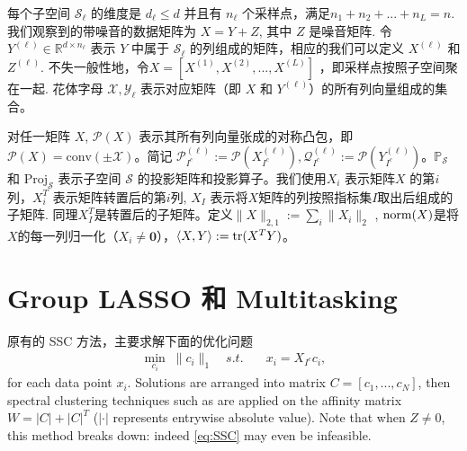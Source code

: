 \documentclass[main]{subfiles}
\begin{document}
每个子空间 $\mathcal{S}_{\ell}$ 的维度是 $d_{\ell} \le d$ 并且有 $n_{\ell}$
个采样点，满足$n_1 +n_2+...+n_L=n$. 我们观察到的带噪音的数据矩阵为 $X = Y+Z$,
其中 $Z$ 是噪音矩阵. 令 $Y^{(\ell)}\in \mathbb{R}^{d\times n_{\ell}}$ 表示 
$Y$ 中属于 $\mathcal{S}_{\ell}$ 的列组成的矩阵，相应的我们可以定义 $X^{(\ell)}$ 和 $Z^{(\ell)}$.
不失一般性地，令$X=[X^{(1)},X^{(2)},...,X^{(L)}]$ ，即采样点按照子空间聚在一起.
花体字母 $\mathcal{X},\mathcal{Y_{\ell}}$ 表示对应矩阵（即 $X$ 和 $Y^{(\ell)}$）的所有列向量组成的集合。

对任一矩阵 $X$, $\mathcal{P}(X)$ 表示其所有列向量张成的对称凸包，即
$\mathcal{P}(X) = \mathrm{conv}(\pm \mathcal{X})$。简记
$\mathcal{P}_{I^c}^{(\ell)} := \mathcal{P}(X_{I^c}^{(\ell)}), \mathcal{Q}_{I^c}^{(\ell)} :=
\mathcal{P}(Y_{I^c}^{(\ell)})$。$\mathbb{P}_{\mathcal{S}}$ 和
$\mathrm{Proj}_{\mathcal{S}}$ 表示子空间 $\mathcal{S}$
的投影矩阵和投影算子。我们使用$X_i$ 表示矩阵$X$ 的第$i$列，$X_i^T$ 表示矩阵转置后的第$i$列, $X_I$
表示将$X$矩阵的列按照指标集$I$取出后组成的子矩阵.
同理$X^T_I$是转置后的子矩阵。定义$\|X\|_{2, 1}:= \sum_i \|X_i\|_2$ ,
$\mathrm{norm}(X)$是将$X$的每一列归一化（$X_i \neq \mathbf{0}$），$\langle X, Y \rangle
:= \mathrm{tr}(X^T Y)$。

\section{Group LASSO 和 Multitasking}
原有的 SSC 方法，主要求解下面的优化问题
\begin{equation}\label{eq:SSC}
  \begin{aligned}
    \min_{c_i} \; \|c_i\|_1 \quad s.t. \quad &x_i=X_{I^c}c_i,
  \end{aligned}
\end{equation}
for each data point $x_i$. Solutions are arranged into matrix $C=[c_1,...,c_N]$, then spectral clustering techniques such as \cite{ng2002spectral} are applied on the affinity matrix $W=|C|+|C|^T$ ($|\cdot|$ represents entrywise absolute value). Note that when $Z\neq 0$, this method breaks down: indeed \eqref{eq:SSC} may even be infeasible.
\end{document}
